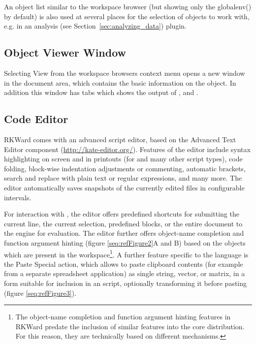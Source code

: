 An object list similar to the workspace browser (but showing only the
globalenv() by default) is also used at several places for the
selection of objects to work with, e.g. in an analysis (see Section~\ref{sec:analyzing_data})
plugin.

\subsection{Object Viewer Window}
\label{sec:object_viewer_window}

Selecting View from the workspace
browsers context menu opens a new window in the
document area, which contains the basic information on the object. In
addition this window has tabs which shows the output of
, and .

\subsection{Code Editor}
\label{sec:code_editor}

RKWard comes with an advanced
 script editor, based on the
 Advanced Text Editor component
(\url{http://kate-editor.org/}). Features of the
editor include syntax highlighting on screen and in printouts (for
 and many other script types), code
folding, block-wise indentation adjustments or commenting, automatic
brackets, search and replace with plain text or regular expressions,
and many more. The editor automatically saves snapshots of the
currently edited files in configurable intervals.

For interaction with , the editor offers
predefined shortcuts for submitting the current line, the current
selection, predefined blocks, or the entire document to the
 engine for evaluation. The editor further
offers object-name completion and function argument hinting (figure
\ref{seq:refFigure2}A and B) based on the objects which are present in
the  workspace\footnote{The object-name
completion and function argument hinting features in RKWard predate the
inclusion of similar features into the core
 distribution. For this reason, they are
technically based on different mechanisms.}. A further feature specific
to the  language is the
Paste Special action, which allows to
paste clipboard contents (for example from a separate spreadsheet
application) as single string, vector, or matrix, in a form suitable
for inclusion in an  script, optionally
transforming it before pasting (figure \ref{seq:refFigure3}).

